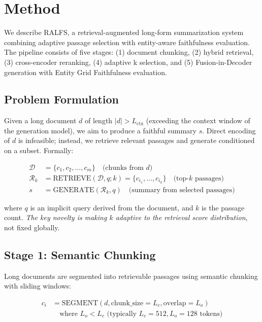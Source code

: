 \documentclass[11pt,a4paper]{article}
\begin{document}
\section{Method}
\label{sec:method}

We describe RALFS, a retrieval-augmented long-form summarization system combining adaptive passage selection with entity-aware faithfulness evaluation. The pipeline consists of five stages: (1) document chunking, (2) hybrid retrieval, (3) cross-encoder reranking, (4) adaptive k selection, and (5) Fusion-in-Decoder generation with Entity Grid Faithfulness evaluation.

\subsection{Problem Formulation}

Given a long document $d$ of length $|d| > L_{\text{ctx}}$ (exceeding the context window of the generation model), we aim to produce a faithful summary $s$. Direct encoding of $d$ is infeasible; instead, we retrieve relevant passages and generate conditioned on a subset. Formally:

\begin{align}
\mathcal{D} &= \{c_1, c_2, \ldots, c_m\} \quad \text{(chunks from } d\text{)} \\
\mathcal{R}_k &= \text{RETRIEVE}(\mathcal{D}, q; k) = \{c_{i_1}, \ldots, c_{i_k}\} \quad \text{(top-}k\text{ passages)} \\
s &= \text{GENERATE}(\mathcal{R}_k, q) \quad \text{(summary from selected passages)}
\end{align}

where $q$ is an implicit query derived from the document, and $k$ is the passage count. \emph{The key novelty is making $k$ adaptive to the retrieval score distribution}, not fixed globally.

\subsection{Stage 1: Semantic Chunking}

Long documents are segmented into retrievable passages using semantic chunking with sliding windows:

\begin{align}
c_i &= \text{SEGMENT}(d, \text{chunk\_size}=L_c, \text{overlap}=L_o) \\
&\quad \text{where } L_o < L_c \text{ (typically } L_c = 512, L_o = 128 \text{ tokens)}
\end{align}
\end{document}
